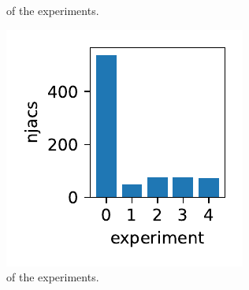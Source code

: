 \documentclass{report}
\begin{document}
\begin{figure}[h]
\begin{minipage}[t]{0.3\textwidth}
\caption{  of the experiments.}
\label{pl:nfcns_indx1}
\end{minipage}
\hfill
\begin{minipage}[t]{0.3\textwidth}
\centering
\includegraphics[width=\textwidth]{../Plots/Project2_main/Figure_702}
\caption{  of the experiments.}
\label{pl:njacs_indx1}
\end{minipage}
\end{figure}
\end{document}
